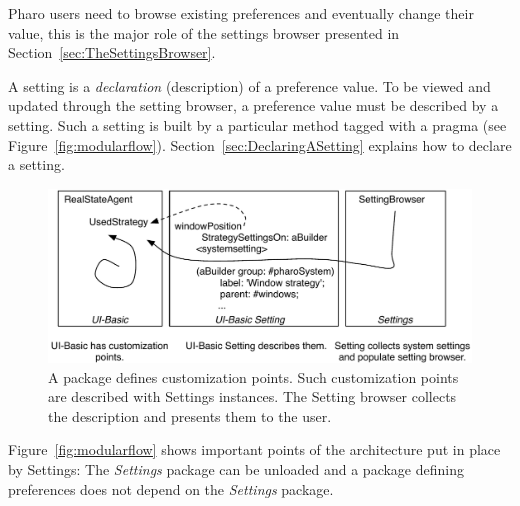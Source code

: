 \documentclass[a4paper,10pt,twoside]{book}
\begin{document}
Pharo users need to browse existing preferences and eventually change their value, this is the major role of the settings browser presented in Section~\ref{sec:TheSettingsBrowser}.

A setting is a \emph{declaration} (description) of a preference value. To be viewed and updated through the setting browser, a preference value must be described by a setting. Such a setting is built by a particular method tagged with a pragma (see Figure~\ref{fig:modularflow}). Section~\ref{sec:DeclaringASetting} explains how to declare a setting.


\begin{figure}[tbh]
\begin{center}
\includegraphics[scale=0.5]{modularflow}
\caption{A package defines customization points. Such customization points are described with Settings instances. The Setting browser collects the description and presents them to the user.}
\end{center}
\end{figure}

Figure~\ref{fig:modularflow} shows important points of the architecture put in place by Settings: The \emph{Settings} package can be unloaded and a package defining preferences does not depend
on the \emph{Settings} package.
\end{document}
